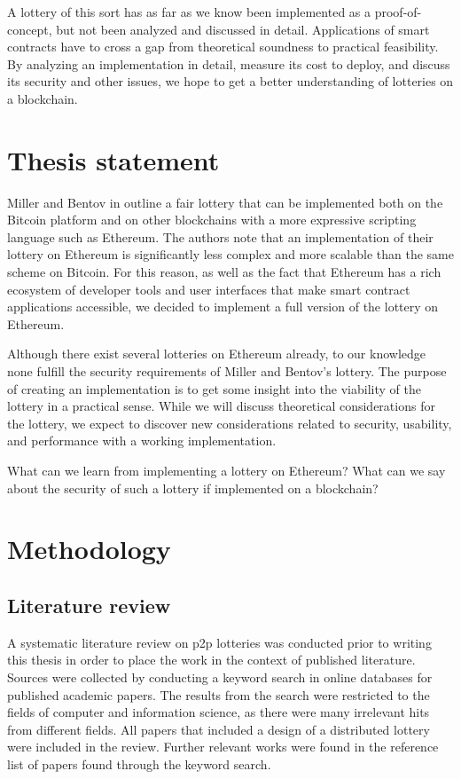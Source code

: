 A lottery of this sort has as far as we know been implemented as a proof-of-concept, but not been analyzed and discussed in detail. Applications of smart contracts have to cross a gap from theoretical soundness to practical feasibility. By analyzing an implementation in detail, measure its cost to deploy, and discuss its security and other issues, we hope to get a better understanding of lotteries on a blockchain.

\section{Thesis statement}
\label{sec:statement}

Miller and Bentov in \cite{miller_zero-collateral_2017} outline a fair lottery that can be implemented both on the Bitcoin platform and on other blockchains with a more expressive scripting language such as Ethereum. The authors note that an implementation of their lottery on Ethereum is significantly less complex and more scalable than the same scheme on Bitcoin. For this reason, as well as the fact that Ethereum has a rich ecosystem of developer tools and user interfaces that make smart contract applications accessible, we decided to implement a full version of the lottery on Ethereum. 

Although there exist several lotteries on Ethereum already, to our knowledge none fulfill the security requirements of Miller and Bentov's lottery. The purpose of creating an implementation is to get some insight into the viability of the lottery in a practical sense. While we will discuss theoretical considerations for the lottery, we expect to discover new considerations related to security, usability, and performance with a working implementation. 

What can we learn from implementing a lottery on Ethereum? What can we say about the security of such a lottery if implemented on a blockchain?

\section{Methodology}
\label{sec:methodology}

\subsection{Literature review}

A systematic literature review on p2p lotteries was conducted prior to writing this thesis in order to place the work in the context of published literature. Sources were collected by conducting a keyword search in online databases for published academic papers. The results from the search were restricted to the fields of computer and information science, as there were many irrelevant hits from different fields. All papers that included a design of a distributed lottery were included in the review. Further relevant works were found in the reference list of papers found through the keyword search. 

